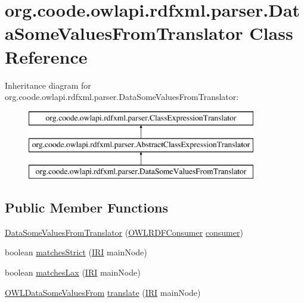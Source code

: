 \hypertarget{classorg_1_1coode_1_1owlapi_1_1rdfxml_1_1parser_1_1_data_some_values_from_translator}{\section{org.\-coode.\-owlapi.\-rdfxml.\-parser.\-Data\-Some\-Values\-From\-Translator Class Reference}
\label{classorg_1_1coode_1_1owlapi_1_1rdfxml_1_1parser_1_1_data_some_values_from_translator}
}
Inheritance diagram for org.\-coode.\-owlapi.\-rdfxml.\-parser.\-Data\-Some\-Values\-From\-Translator\-:\begin{figure}[H]
\begin{center}
\leavevmode
\includegraphics[height=3.000000cm]{classorg_1_1coode_1_1owlapi_1_1rdfxml_1_1parser_1_1_data_some_values_from_translator}
\end{center}
\end{figure}
\subsection*{Public Member Functions}
\begin{DoxyCompactItemize}
\item 
\hyperlink{classorg_1_1coode_1_1owlapi_1_1rdfxml_1_1parser_1_1_data_some_values_from_translator_a5bde24bdef5f0e1aa590a3715426ffa4}{Data\-Some\-Values\-From\-Translator} (\hyperlink{classorg_1_1coode_1_1owlapi_1_1rdfxml_1_1parser_1_1_o_w_l_r_d_f_consumer}{O\-W\-L\-R\-D\-F\-Consumer} \hyperlink{classorg_1_1coode_1_1owlapi_1_1rdfxml_1_1parser_1_1_abstract_class_expression_translator_ae547084cdd5b92c03835b5aa404f823b}{consumer})
\item 
boolean \hyperlink{classorg_1_1coode_1_1owlapi_1_1rdfxml_1_1parser_1_1_data_some_values_from_translator_a057caa72a21767f81ab2716b0e87eff3}{matches\-Strict} (\hyperlink{classorg_1_1semanticweb_1_1owlapi_1_1model_1_1_i_r_i}{I\-R\-I} main\-Node)
\item 
boolean \hyperlink{classorg_1_1coode_1_1owlapi_1_1rdfxml_1_1parser_1_1_data_some_values_from_translator_a0fda1ebb9838f64c88b08f8f102d9d7e}{matches\-Lax} (\hyperlink{classorg_1_1semanticweb_1_1owlapi_1_1model_1_1_i_r_i}{I\-R\-I} main\-Node)
\item 
\hyperlink{interfaceorg_1_1semanticweb_1_1owlapi_1_1model_1_1_o_w_l_data_some_values_from}{O\-W\-L\-Data\-Some\-Values\-From} \hyperlink{classorg_1_1coode_1_1owlapi_1_1rdfxml_1_1parser_1_1_data_some_values_from_translator_a551b25eaee420984ad09b9693663ec52}{translate} (\hyperlink{classorg_1_1semanticweb_1_1owlapi_1_1model_1_1_i_r_i}{I\-R\-I} main\-Node)
\end{DoxyCompactItemize}
